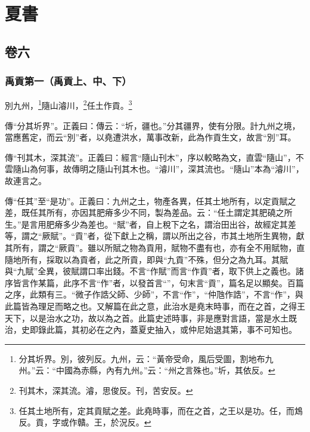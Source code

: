 

\part{夏書}


\chapter{卷六}


\section{禹貢第一（禹貢上、中、下）}

別九州，\footnote{分其圻界。別，彼列反。九州，云：“黃帝受命，風后受圖，割地布九州。”云：“中國為赤縣，內有九州。”云：“州之言殊也。”圻，其依反。}隨山濬川，\footnote{刊其木，深其流。濬，思俊反。刊，苦安反。}任土作貢。\footnote{任其土地所有，定其貢賦之差。此堯時事，而在之首，之王以是功。任，而鴆反。貢，字或作贛。王，於況反。}

{\noindent\zhuan{}\fzbyks 傳“分其圻界”。正義曰：傳云：“圻，疆也。”分其疆界，使有分限。計九州之境，當應舊定，而云“別”者，以堯遭洪水，萬事改新，此為作貢生文，故言“別”耳。 \par}

{\noindent\zhuan{}\fzbyks 傳“刊其木，深其流”。正義曰：經言“隨山刊木”，序以較略為文，直雲“隨山”，不雲隨山為何事，故傳明之隨山刊其木也。“濬川”，深其流也。“隨山”本為“濬川”，故連言之。 \par}

{\noindent\zhuan{}\fzbyks 傳“任其”至“是功”。正義曰：九州之土，物產各異，任其土地所有，以定貢賦之差，既任其所有，亦因其肥瘠多少不同，製為差品。云：“任土謂定其肥磽之所生。”是言用肥瘠多少為差也。“賦”者，自上稅下之名，謂治田出谷，故經定其差等，謂之“厥賦”。“貢”者，從下獻上之稱，謂以所出之谷，市其土地所生異物，獻其所有，謂之“厥貢”。雖以所賦之物為貢用，賦物不盡有也，亦有全不用賦物，直隨地所有，採取以為貢者，此之所貢，即與“九貢”不殊，但分之為九耳。其賦與“九賦”全異，彼賦謂口率出錢。不言“作賦”而言“作貢”者，取下供上之義也。諸序皆言作某篇，此序不言“作”者，以發首言“”，句末言“貢”，篇名足以顯矣。百篇之序，此類有三。“微子作誥父師、少師”，不言“作”，“仲虺作誥”，不言“作”，與此篇皆為理足而略之也。又解篇在此之意，此治水是堯末時事，而在之首，之得王天下，以是治水之功，故以為之首。此篇史述時事，非是應對言語，當是水土既治，史即錄此篇，其初必在之內，蓋夏史抽入，或仲尼始退其第，事不可知也。 \par}

